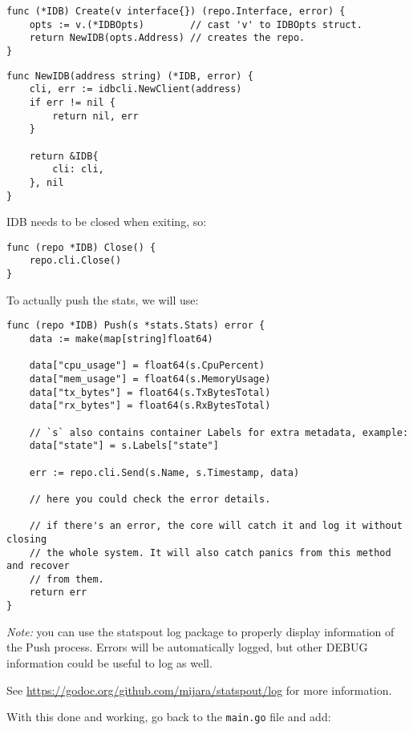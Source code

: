 \begin{lstlisting}[language=Golang]
func (*IDB) Create(v interface{}) (repo.Interface, error) {
    opts := v.(*IDBOpts)        // cast 'v' to IDBOpts struct.
    return NewIDB(opts.Address) // creates the repo.
}
\end{lstlisting}

\begin{lstlisting}[language=Golang]
func NewIDB(address string) (*IDB, error) {
    cli, err := idbcli.NewClient(address)
    if err != nil {
        return nil, err
    }

    return &IDB{
        cli: cli,
    }, nil
}
\end{lstlisting}

IDB needs to be closed when exiting, so:

\begin{lstlisting}[language=Golang]
func (repo *IDB) Close() {
    repo.cli.Close()
}
\end{lstlisting}

To actually push the stats, we will use:

\begin{lstlisting}[language=Golang]
func (repo *IDB) Push(s *stats.Stats) error {
    data := make(map[string]float64)

    data["cpu_usage"] = float64(s.CpuPercent)
    data["mem_usage"] = float64(s.MemoryUsage)
    data["tx_bytes"] = float64(s.TxBytesTotal)
    data["rx_bytes"] = float64(s.RxBytesTotal)

    // `s` also contains container Labels for extra metadata, example:
    data["state"] = s.Labels["state"]

    err := repo.cli.Send(s.Name, s.Timestamp, data)

    // here you could check the error details.

    // if there's an error, the core will catch it and log it without closing
    // the whole system. It will also catch panics from this method and recover
    // from them.
    return err
}
\end{lstlisting}

\textit{Note:} you can use the statspout log package to properly display information of the Push process. Errors will be automatically logged, but other DEBUG information could be useful to log as well.

See \url{https://godoc.org/github.com/mijara/statspout/log} for more information.

With this done and working, go back to the \texttt{main.go} file and add:

